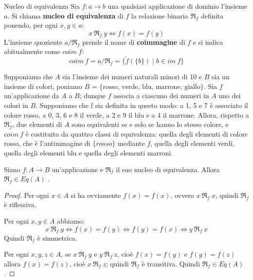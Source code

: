 \begin{defbox}{Nucleo di equivalenza}
	Sia $f:a \rightarrow b$ una qualsiasi applicazione di dominio l'insieme $a$. Si chiama \textbf{nucleo di equivalenza} di $f$ la relazione binaria $\mathfrak{R}_{f}$ definita ponendo, per ogni $x,y \in a$:
	\begin{equation}
		x \ \mathfrak{R}_{f} \ y \Longleftrightarrow f(x) = f(y)
	\end{equation}
	L'insieme quoziente $a/{\mathfrak{R}_{f}}$ prende il nome di \textbf{coimmagine} di $f$ e si indica abitualmente come $coim \ f$:
	\begin{equation}
		coim \ f  = a / \mathfrak{R}_{f} = \{ \overleftarrow{f}(\{b\}) \; | \; b \in im \ f\}
	\end{equation}
\end{defbox}

\begin{example}
	Supponiamo che $A$ sia l’insieme dei numeri naturali minori di 10 e $B$ sia un insieme di colori, poniamo	$B$ = $\{\text{rosso, verde, blu, marrone, giallo}\}$. Sia $f$ un’applicazione da $A$ a $B$; dunque $f$ associa a ciascuno dei numeri in $A$ uno dei colori in $B$. Supponiamo che f sia definita in questo modo: a 1, 5 e 7 è associato il colore rosso, a 0, 3, 6 e 8 il verde, a 2 e 9 il blu e a 4 il marrone. Allora, rispetto a $\mathfrak{R}_{f}$, due elementi di $A$ sono equivalenti se e solo se hanno lo stesso colore, e $coim \ f$ è costituita da quattro classi di equivalenza: quella degli elementi di colore rosso, che è l'antimmagine di $\{rosso\}$ mediante $f$, quella degli elementi verdi, quella degli elementi blu e quella degli elementi marroni.
\end{example}
\begin{propbox}
	Siano $f:A \rightarrow B$ un'applicazione e $\mathfrak{R}_{f}$ il suo nucleo di equivalenza. Allora $\mathfrak{R}_{f} \in Eq(A)$ .
\end{propbox}

\begin{proof}
	Per ogni $x \in A$ si ha ovviamente $f(x) = f(x)$, ovvero $x \ \mathfrak{R}_{f} \ x$, quindi $\mathfrak{R}_{f}$ è riflessiva.
	
	Per ogni $x,y \in A$ abbiamo: $$x \ \mathfrak{R}_{f} \ y \iff f(x) = f(y) \iff f(y) = f(x) \iff y \ \mathfrak{R}_{f} \ x$$ Quindi $\mathfrak{R}_{f}$ è simmetrica.
	
	Per ogni $x,y,z \in A$, se $x \ \mathfrak{R}_{f} \ y$ e  $y \ \mathfrak{R}_{f} \ z$, cioè $f(x)=f(y)$ e $f(y)=f(z)$ allora $f(x)=f(z)$, cioè $x \ \mathfrak{R}_{f} \ z$; quindi $\mathfrak{R}_{f}$ è transitiva. Quindi $\mathfrak{R}_{f} \in Eq(A)$.
\end{proof}


